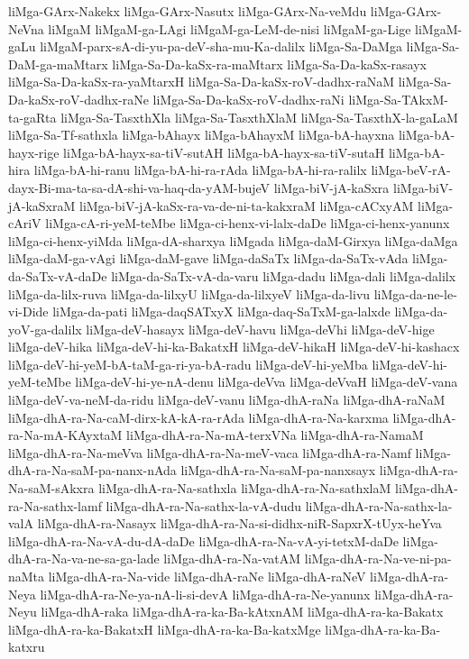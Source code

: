 {liMga-GArx-Nakekx
liMga-GArx-Nasutx
liMga-GArx-Na-veMdu
liMga-GArx-NeVna
liMgaM
liMgaM-ga-LAgi
liMgaM-ga-LeM-de-nisi
liMgaM-ga-Lige
liMgaM-gaLu
liMgaM-parx-sA-di-yu-pa-deV-sha-mu-Ka-dalilx
liMga-Sa-DaMga
liMga-Sa-DaM-ga-maMtarx
liMga-Sa-Da-kaSx-ra-maMtarx
liMga-Sa-Da-kaSx-rasayx
liMga-Sa-Da-kaSx-ra-yaMtarxH
liMga-Sa-Da-kaSx-roV-dadhx-raNaM
liMga-Sa-Da-kaSx-roV-dadhx-raNe
liMga-Sa-Da-kaSx-roV-dadhx-raNi
liMga-Sa-TAkxM-ta-gaRta
liMga-Sa-TasxthXla
liMga-Sa-TasxthXlaM
liMga-Sa-TasxthX-la-gaLaM
liMga-Sa-Tf-sathxla
liMga-bAhayx
liMga-bAhayxM
liMga-bA-hayxna
liMga-bA-hayx-rige
liMga-bA-hayx-sa-tiV-sutAH
liMga-bA-hayx-sa-tiV-sutaH
liMga-bA-hira
liMga-bA-hi-ranu
liMga-bA-hi-ra-rAda
liMga-bA-hi-ra-ralilx
liMga-beV-rA-dayx-Bi-ma-ta-sa-dA-shi-va-haq-da-yAM-bujeV
liMga-biV-jA-kaSxra
liMga-biV-jA-kaSxraM
liMga-biV-jA-kaSx-ra-va-de-ni-ta-kakxraM
liMga-cACxyAM
liMga-cAriV
liMga-cA-ri-yeM-teMbe
liMga-ci-henx-vi-lalx-daDe
liMga-ci-henx-yanunx
liMga-ci-henx-yiMda
liMga-dA-sharxya
liMgada
liMga-daM-Girxya
liMga-daMga
liMga-daM-ga-vAgi
liMga-daM-gave
liMga-daSaTx
liMga-da-SaTx-vAda
liMga-da-SaTx-vA-daDe
liMga-da-SaTx-vA-da-varu
liMga-dadu
liMga-dali
liMga-dalilx
liMga-da-lilx-ruva
liMga-da-lilxyU
liMga-da-lilxyeV
liMga-da-livu
liMga-da-ne-le-vi-Dide
liMga-da-pati
liMga-daqSATxyX
liMga-daq-SaTxM-ga-lalxde
liMga-da-yoV-ga-dalilx
liMga-deV-hasayx
liMga-deV-havu
liMga-deVhi
liMga-deV-hige
liMga-deV-hika
liMga-deV-hi-ka-BakatxH
liMga-deV-hikaH
liMga-deV-hi-kashacx
liMga-deV-hi-yeM-bA-taM-ga-ri-ya-bA-radu
liMga-deV-hi-yeMba
liMga-deV-hi-yeM-teMbe
liMga-deV-hi-ye-nA-denu
liMga-deVva
liMga-deVvaH
liMga-deV-vana
liMga-deV-va-neM-da-ridu
liMga-deV-vanu
liMga-dhA-raNa
liMga-dhA-raNaM
liMga-dhA-ra-Na-caM-dirx-kA-kA-ra-rAda
liMga-dhA-ra-Na-karxma
liMga-dhA-ra-Na-mA-KAyxtaM
liMga-dhA-ra-Na-mA-terxVNa
liMga-dhA-ra-NamaM
liMga-dhA-ra-Na-meVva
liMga-dhA-ra-Na-meV-vaca
liMga-dhA-ra-Namf
liMga-dhA-ra-Na-saM-pa-nanx-nAda
liMga-dhA-ra-Na-saM-pa-nanxsayx
liMga-dhA-ra-Na-saM-sAkxra
liMga-dhA-ra-Na-sathxla
liMga-dhA-ra-Na-sathxlaM
liMga-dhA-ra-Na-sathx-lamf
liMga-dhA-ra-Na-sathx-la-vA-dudu
liMga-dhA-ra-Na-sathx-la-valA
liMga-dhA-ra-Nasayx
liMga-dhA-ra-Na-si-didhx-niR-SapxrX-tUyx-heYva
liMga-dhA-ra-Na-vA-du-dA-daDe
liMga-dhA-ra-Na-vA-yi-tetxM-daDe
liMga-dhA-ra-Na-va-ne-sa-ga-lade
liMga-dhA-ra-Na-vatAM
liMga-dhA-ra-Na-ve-ni-pa-naMta
liMga-dhA-ra-Na-vide
liMga-dhA-raNe
liMga-dhA-raNeV
liMga-dhA-ra-Neya
liMga-dhA-ra-Ne-ya-nA-li-si-devA
liMga-dhA-ra-Ne-yanunx
liMga-dhA-ra-Neyu
liMga-dhA-raka
liMga-dhA-ra-ka-Ba-kAtxnAM
liMga-dhA-ra-ka-Bakatx
liMga-dhA-ra-ka-BakatxH
liMga-dhA-ra-ka-Ba-katxMge
liMga-dhA-ra-ka-Ba-katxru
}
